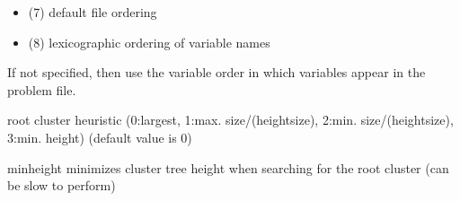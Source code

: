 \documentclass[letterpaper,10pt,openany,oneside,english]{sphinxmanual}
\begin{document}
\begin{description}
\begin{itemize}
\item {} 
\sphinxAtStartPar
(\sphinxhyphen{}7) default file ordering

\item {} 
\sphinxAtStartPar
(\sphinxhyphen{}8) lexicographic ordering of variable names

\end{itemize}

\sphinxAtStartPar
If not specified, then use the variable order in which variables appear in the problem file.

\sphinxAtStartPar
root cluster heuristic
(0:largest, 1:max. size/(height\sphinxhyphen{}size), 2:min. size/(height\sphinxhyphen{}size), 3:min. height) (default value is 0)

\end{description}
\begin{optionlist}{3cm}
\item [\sphinxhyphen{}minheight]  
\sphinxAtStartPar
minimizes cluster tree height when searching for the root cluster (can be slow to perform)
\end{optionlist}
\end{document}
